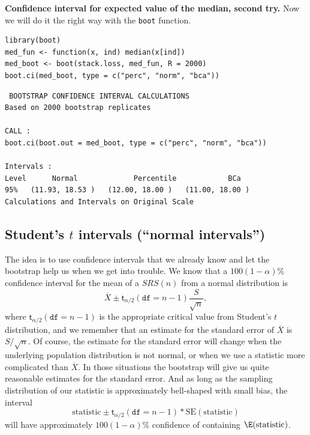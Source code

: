 \documentclass[captions=tableheading]{scrbook}
\begin{document}
\begin{example}
\textbf{Confidence interval for expected value of the median, second try.}  Now we will do it the right way with the \texttt{boot} function.


\begin{verbatim}
library(boot)
med_fun <- function(x, ind) median(x[ind])
med_boot <- boot(stack.loss, med_fun, R = 2000)
boot.ci(med_boot, type = c("perc", "norm", "bca"))
\end{verbatim}


\begin{verbatim}
 BOOTSTRAP CONFIDENCE INTERVAL CALCULATIONS
Based on 2000 bootstrap replicates

CALL : 
boot.ci(boot.out = med_boot, type = c("perc", "norm", "bca"))

Intervals : 
Level      Normal             Percentile            BCa          
95%   (11.93, 18.53 )   (12.00, 18.00 )   (11.00, 18.00 )  
Calculations and Intervals on Original Scale
\end{verbatim}

\end{example}
\subsection{Student's \(t\) intervals (``normal intervals'')}
\label{sec-13-3-2}


The idea is to use confidence intervals that we already know and let the bootstrap help us when we get into trouble. We know that a \(100(1-\alpha)\%\) confidence interval for the mean of a \(SRS(n)\) from a normal distribution is 
\begin{equation} 
\overline{X}\pm\mathsf{t}_{\alpha/2}(\mathtt{df}=n-1)\frac{S}{\sqrt{n}},
\end{equation} 
where \(\mathsf{t}_{\alpha/2}(\mathtt{df}=n-1)\) is the appropriate critical value from Student's \(t\) distribution, and we remember that an estimate for the standard error of \(\overline{X}\) is \(S/\sqrt{n}\). Of course, the estimate for the standard error will change when the underlying population distribution is not normal, or when we use a statistic more complicated than \(\overline{X}\). In those situations the bootstrap will give us quite reasonable estimates for the standard error. And as long as the sampling distribution of our statistic is approximately bell-shaped with small bias, the interval 
\begin{equation}
\mbox{statistic}\pm\mathsf{t}_{\alpha/2}(\mathtt{df}=n-1)*\mathrm{SE}(\mbox{statistic})
\end{equation}
 will have approximately \(100(1-\alpha)\%\) confidence of containing \(\E(\mathrm{statistic})\). 
\end{document}
